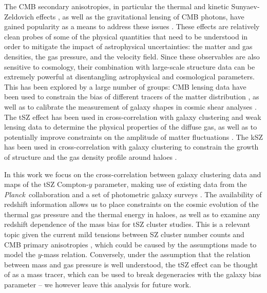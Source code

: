 \documentclass[useAMS,usenatbib]{mn2e}
\def\planck{{\it Planck\/}}
\begin{document}
  The CMB secondary anisotropies, in particular the thermal and kinetic Sunyaev-Zeldovich effects \citep[tSZ and kSZ respectively,][]{1972CoASP...4..173S}, as well as the gravitational lensing of CMB photons, have gained popularity as a means to address these issues \citep{2017JCAP...11..040B,2019BAAS...51c.297B}. These effects are relatively clean probes of some of the physical quantities that need to be understood in order to mitigate the impact of astrophysical uncertainties: the matter and gas densities, the gas pressure, and the velocity field. Since these observables are also sensitive to cosmology, their combination with large-scale structure data can be extremely powerful at disentangling astrophysical and cosmological parameters. This has been explored by a large number of groups: CMB lensing data have been used to constrain the bias of different tracers of the matter distribution \citep[e.g.][]{2019MNRAS.485.1720H,2018JCAP...04..053A,2019PhRvD.100b3541A,2018MNRAS.481.1133P}, as well as to calibrate the measurement of galaxy shapes in cosmic shear analyses \citep{2019PhRvD.100b3541A}. The tSZ effect has been used in cross-correlation with galaxy clustering and weak lensing data to determine the physical properties of the diffuse gas, as well as to potentially improve constraints on the amplitude of matter fluctuations \citep{2014PhRvD..89b3508V,2014JCAP...02..030H,2015JCAP...09..046M,2017MNRAS.471.1565H,2017ApJ...845...71A,2018PhRvD..97f3514A,2018MNRAS.480.3928M,2019A&A...624A..48D,2019MNRAS.483..223T,2019arXiv190306654T,2019arXiv190413347P,2019arXiv190707870M}. The kSZ has been used in cross-correlation with galaxy clustering to constrain the growth of structure and the gas density profile around haloes \citep{2016PhRvD..93h2002S,2016A&A...586A.140P,2016PhRvL.117e1301H,2016MNRAS.461.3172S,2017JCAP...03..008D}.
  
  In this work we focus on the cross-correlation between galaxy clustering data and maps of the tSZ Compton-$y$ parameter, making use of existing data from the \planck\ collaboration \citep{2016A&A...594A..22P} and a set of photometric galaxy surveys \citep{2014ApJS..210....9B,2016ApJS..225....5B}. The availability of redshift information allows us to place constraints on the cosmic evolution of the thermal gas pressure and the thermal energy in haloes, as well as to examine any redshift dependence of the mass bias for tSZ cluster studies. This is a relevant topic given the current mild tensions between SZ cluster number counts and CMB primary anisotropies \citep{2016A&A...594A..24P,2016ApJ...832...95D,2019ApJ...878...55B,2019MNRAS.489..401Z}, which could be caused by the assumptions made to model the $y$-mass relation. Conversely, under the assumption that the relation between mass and gas pressure is well understood, the tSZ effect can be thought of as a mass tracer, which can be used to break degeneracies with the galaxy bias parameter -- we however leave this analysis for future work.
\end{document}
